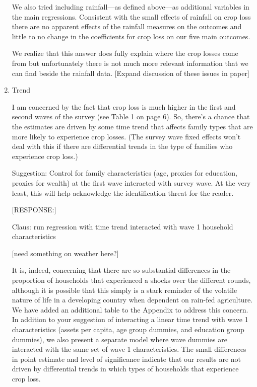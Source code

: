 \documentclass[letterpaper,12pt]{article}
\begin{document}
\begin{enumerate}
We also tried including rainfall---as defined above---as 
additional variables in the main regressions.
Consistent with the small effects of rainfall on crop loss
there are no apparent effects of the rainfall measures on the
outcomes and little to no change in the coefficients for crop
loss on our five main outcomes.

We realize that this answer does fully explain where the
crop losses come from but unfortunately there is not much
more relevant information that we can find beside the
rainfall data.
[Expand discussion of these issues in paper]







\item Trend

I am concerned by the fact that crop loss is much higher in the first
and second waves of the survey (see Table 1 on page 6). So, there's a
chance that the estimates are driven by some time trend that affects
family types that are more likely to experience crop losses. (The survey
wave fixed effects won't deal with this if there are differential trends
in the type of families who experience crop loss.)

Suggestion: Control for family characteristics (age, proxies for
education, proxies for wealth) at the first wave interacted with survey
wave. At the very least, this will help acknowledge the identification
threat for the reader.


[RESPONSE:] 

Claus: run regression with time trend interacted with wave 1 household characteristics

[need something on weather here?]

It is, indeed, concerning that there are so substantial
differences in the proportion of households that experienced a 
shocks over the different rounds, although it is possible that
this simply is a stark reminder of the volatile nature of life
in a developing country when dependent on rain-fed agriculture.
We have added an additional table to the Appendix to address this
concern. In addition to your suggestion of interacting a linear
time trend with wave 1 characteristics (assets per capita,
age group dummies, and education group dummies), we also present
a separate model where wave dummies are interacted with the
same set of wave 1 characteristics.
The small differences in point estimate and level of significance 
indicate that our results are not driven by differential trends
in which types of households that experience crop loss.


\end{enumerate}
\end{document}
